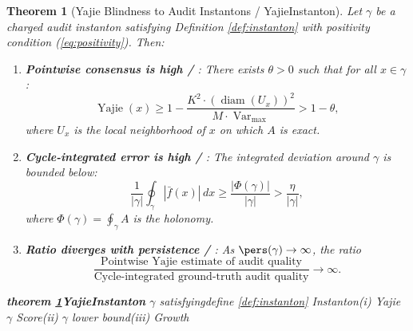 \documentclass[11pt,a4paper]{article}
\theoremstyle{plain}
\newtheorem{theorem}{Theorem}[section]
\theoremstyle{definition}
\DeclareMathOperator{\diam}{diam}
\DeclareMathOperator{\Yajie}{Yajie}
\begin{document}
\begin{theorem}[Yajie Blindness to Audit Instantons / YajieInstanton]
\label{thm:yajie_blindness}
Let $\gamma$ be a charged audit instanton satisfying Definition 
\ref{def:instanton} with positivity condition (\ref{eq:positivity}). 
Then:
\begin{enumerate}[label=(\roman*)]
  \item \textbf{Pointwise consensus is high / }: 
        There exists $\theta > 0$ such that for all $x \in \gamma$:
        \begin{equation}
          \Yajie(x) \geq 1 - \frac{K^2 \cdot (\diam(U_x))^2}{M \cdot \operatorname{Var}_{\max}} > 1 - \theta,
          \label{eq:yajie_high}
        \end{equation}
        where $U_x$ is the local neighborhood of $x$ on which $A$ is exact.
  
  \item \textbf{Cycle-integrated error is high / }: 
        The integrated deviation around $\gamma$ is bounded below:
        \begin{equation}
          \frac{1}{|\gamma|} \oint_{\gamma} |\bar{f}(x)| \, dx \geq 
          \frac{|\Phi(\gamma)|}{|\gamma|} > \frac{\eta}{|\gamma|},
          \label{eq:cycle_error}
        \end{equation}
        where $\Phi(\gamma) = \oint_{\gamma} A$ is the holonomy.
  
  \item \textbf{Ratio diverges with persistence / }: 
        As $\pers(\gamma) \to \infty$, the ratio
        \begin{equation}
          \frac{\text{Pointwise Yajie estimate of audit quality}}
               {\text{Cycle-integrated ground-truth audit quality}} \to \infty.
          \label{eq:divergence}
        \end{equation}
\end{enumerate}
\end{theorem}

\bigskip
\noindent
\textit{\textbf{theorem \ref{thm:yajie_blindness}YajieInstanton} $\gamma$ satisfyingdefine \ref{def:instanton} Instanton(i) Yajie $\gamma$ Score(ii)  $\gamma$ lower bound(iii) Growth}
\end{document}
